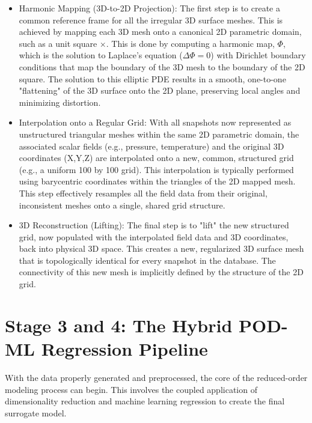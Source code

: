 \documentclass[dsc, EN]{ufabcFHZh}
\begin{document}
\begin{itemize}
    \item Harmonic Mapping (3D-to-2D Projection): The first step is to create a common reference frame for all the irregular 3D surface meshes. This is achieved by mapping each 3D mesh onto a canonical 2D parametric domain, such as a unit square $ \times $. This is done by computing a harmonic map, $\Phi$, which is the solution to Laplace's equation ($\Delta\Phi=0$) with Dirichlet boundary conditions that map the boundary of the 3D mesh to the boundary of the 2D square. The solution to this elliptic PDE results in a smooth, one-to-one "flattening" of the 3D surface onto the 2D plane, preserving local angles and minimizing distortion. 

    \item Interpolation onto a Regular Grid: With all snapshots now represented as unstructured triangular meshes within the same 2D parametric domain, the associated scalar fields (e.g., pressure, temperature) and the original 3D coordinates (X,Y,Z) are interpolated onto a new, common, structured grid (e.g., a uniform 100 by 100 grid). This interpolation is typically performed using barycentric coordinates within the triangles of the 2D mapped mesh. This step effectively resamples all the field data from their original, inconsistent meshes onto a single, shared grid structure. 
    

    \item 3D Reconstruction (Lifting): The final step is to "lift" the new structured grid, now populated with the interpolated field data and 3D coordinates, back into physical 3D space. This creates a new, regularized 3D surface mesh that is topologically identical for every snapshot in the database. The connectivity of this new mesh is implicitly defined by the structure of the 2D grid. 
\end{itemize}

\section{Stage 3 and 4: The Hybrid POD-ML Regression Pipeline}

With the data properly generated and preprocessed, the core of the reduced-order modeling process can begin. This involves the coupled application of dimensionality reduction and machine learning regression to create the final surrogate model.
\end{document}
